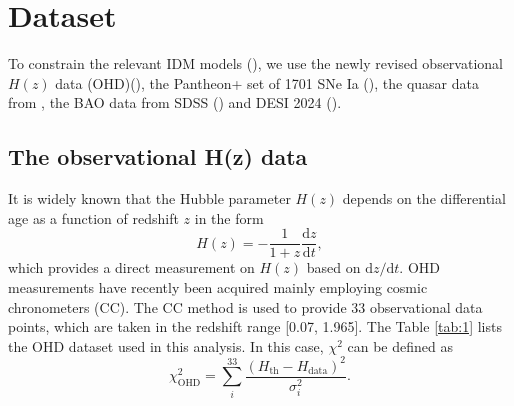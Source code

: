 \documentclass[twocolumn]{aastex631}
\begin{document}
\section{Dataset}

   To constrain the relevant IDM models (\cite{Basilakos_2009}), we use the newly revised
   observational $H(z)$ data (OHD)(\cite{PhysRevD.71.123001, Daniel.Stern_2010, 
   M.Moresco_2012, Zhang_2014, Moresco_2016, 10.1093/mnras/stx301, 10.1093/mnrasl/slv037, 
   Borghi_2022, Jiao_2023}), the Pantheon+ set of 1701 SNe Ia 
   (\cite{Scolnic_2022}), the quasar data from \cite{Lusso_2020}, 
   the BAO data from SDSS (\cite{PhysRevD.103.083533}) and DESI 2024 
   (\cite{desicollaboration2024desi2024vicosmological}).

\subsection{The observational H(z) data}

   It is widely known that the Hubble parameter $H(z)$ depends on
   the differential age as a function of redshift $z$ in the form
   \begin{equation}
      H(z)=-\frac{1}{1+z}\frac{\mathrm{d}z}{\mathrm{d}t},\label{eq:12}
   \end{equation}
   which provides a direct measurement on $H(z)$ based on
   $\mathrm{d}z/\mathrm{d}t$.
   OHD measurements have recently been acquired mainly employing
   cosmic chronometers (CC). The CC method is used to provide 33 observational
   data points, which are taken in the redshift range [0.07, 1.965].
   The Table \ref{tab:1} lists the OHD dataset used in this analysis.
   In this case, $\chi^2$ can be defined as
   \begin{equation}
      \chi_{\text{OHD}}^2=\sum_i^{33}\frac{(H_{\text{th}}-H_{\text{data}})^2}{\sigma_i^2}.
   \end{equation}
\end{document}

